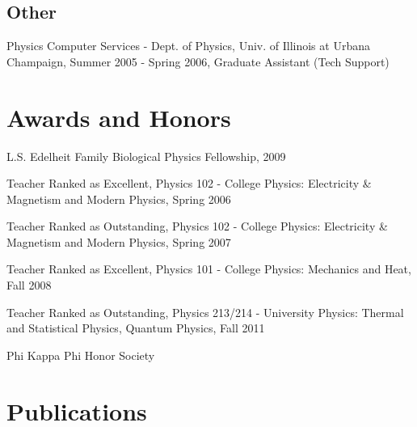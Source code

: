 \documentclass[letterpaper]{article}
\renewenvironment{itemize}{
  \begin{list}{}{
    \setlength{\leftmargin}{1.5em}
  }
}{
  \end{list}
}
\begin{document}
\subsection*{Other}
\begin{itemize}
  \item Physics Computer Services - Dept. of Physics, Univ. of Illinois at
  Urbana Champaign, Summer 2005 - Spring 2006, Graduate Assistant (Tech Support)
\end{itemize}
\section*{Awards and Honors}
\begin{itemize}
  \item L.S. Edelheit Family Biological Physics Fellowship, 2009
  \item Teacher Ranked as Excellent, Physics 102 - College Physics: Electricity
  \& Magnetism and Modern Physics, Spring 2006
  \item Teacher Ranked as Outstanding, Physics 102 - College Physics: Electricity
  \& Magnetism and Modern Physics, Spring 2007
  \item Teacher Ranked as Excellent, Physics 101 - College Physics: Mechanics
  and Heat, Fall 2008
  \item Teacher Ranked as Outstanding, Physics 213/214 - University Physics: Thermal
  and Statistical Physics, Quantum Physics, Fall 2011
  \item Phi Kappa Phi Honor Society
\end{itemize}

\section*{Publications}
\end{document}
